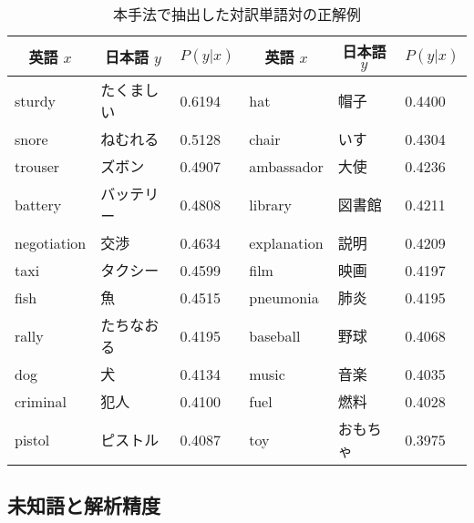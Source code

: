 \begin{table}[htbp]
  \centering
  \caption{本手法で抽出した対訳単語対の正解例}
  \label{tab:correct}
  \begin{tabular}{l|l|l||l|l|l} \hline
    \multicolumn{1}{c|}{英語 $x$} &
    \multicolumn{1}{c|}{日本語 $y$} &
    \multicolumn{1}{c||}{$P(y|x)$} &
    \multicolumn{1}{c|}{英語 $x$} &
    \multicolumn{1}{c|}{日本語 $y$} &
    \multicolumn{1}{c}{$P(y|x)$} \\ \hline

    sturdy & たくましい & 0.6194 &
    hat & 帽子 & 0.4400 \\

    snore & ねむれる & 0.5128 &
    chair & いす & 0.4304 \\

    trouser & ズボン & 0.4907 &
    ambassador & 大使 & 0.4236 \\

    battery & バッテリー & 0.4808 &
    library & 図書館 & 0.4211 \\

    negotiation & 交渉 & 0.4634 &
    explanation & 説明 & 0.4209 \\

    taxi & タクシー & 0.4599 &
    film & 映画 & 0.4197 \\

    fish & 魚 & 0.4515 &
    pneumonia & 肺炎 & 0.4195 \\

    rally & たちなおる & 0.4195 &
    baseball & 野球 & 0.4068 \\

    dog & 犬 & 0.4134 &
    music & 音楽 & 0.4035 \\

    criminal & 犯人 & 0.4100 &
    fuel & 燃料 & 0.4028 \\

    pistol & ピストル & 0.4087 &
    toy & おもちゃ & 0.3975 \\ \hline
  \end{tabular}
\end{table}
\vspace{1em}
\subsection{未知語と解析精度}
\label{sec:unknown}

